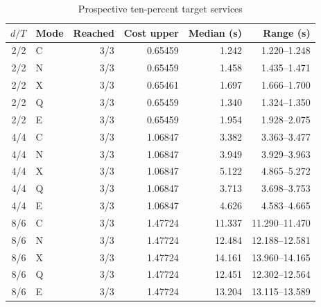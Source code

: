 \begin{table}[htbp]
\centering\caption{Prospective ten-percent target services}\label{tab:target10-57}
{\small\setlength{\tabcolsep}{4pt}\begin{tabular}{rlrrrr}
\hline
$d/T$ & Mode & Reached & Cost upper & Median (s) & Range (s) \\
\hline
2/2 & C & 3/3 & 0.65459 & 1.242 & 1.220--1.248 \\
2/2 & N & 3/3 & 0.65459 & 1.458 & 1.435--1.471 \\
2/2 & X & 3/3 & 0.65461 & 1.697 & 1.666--1.700 \\
2/2 & Q & 3/3 & 0.65459 & 1.340 & 1.324--1.350 \\
2/2 & E & 3/3 & 0.65459 & 1.954 & 1.928--2.075 \\
4/4 & C & 3/3 & 1.06847 & 3.382 & 3.363--3.477 \\
4/4 & N & 3/3 & 1.06847 & 3.949 & 3.929--3.963 \\
4/4 & X & 3/3 & 1.06847 & 5.122 & 4.865--5.272 \\
4/4 & Q & 3/3 & 1.06847 & 3.713 & 3.698--3.753 \\
4/4 & E & 3/3 & 1.06847 & 4.626 & 4.583--4.665 \\
8/6 & C & 3/3 & 1.47724 & 11.337 & 11.290--11.470 \\
8/6 & N & 3/3 & 1.47724 & 12.484 & 12.188--12.581 \\
8/6 & X & 3/3 & 1.47724 & 14.161 & 13.960--14.165 \\
8/6 & Q & 3/3 & 1.47724 & 12.451 & 12.302--12.564 \\
8/6 & E & 3/3 & 1.47724 & 13.204 & 13.115--13.589 \\
\hline\end{tabular}}
\par{}
\end{table}
